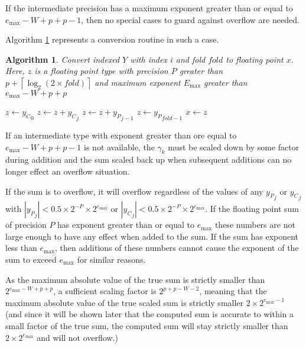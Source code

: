 \documentclass[12pt]{article}
\providecommand{\ceil}[1]{\left \lceil #1 \right \rceil }
\providecommand{\max}{\ensuremath{\text{max}}}
\theoremstyle{plain}
\newtheorem{alg}{Algorithm}[section]
\begin{document}
    If the intermediate precision has a maximum exponent greater than or equal to $e_{\max} - W + p + p - 1$, then no special cases to guard against overflow are needed.

    Algorithm \ref{alg:conv2float} represents a conversion routine in such a case.

    \begin{alg}
      Convert indexed $Y$ with index $i$ and fold $fold$ to floating point $x$. Here, $z$ is a floating point type with precision $P$ greater than $p + \ceil{\log_2(2 \times fold)}$ and maximum exponent $E_{\max}$ greater than $e_{\max} - W + p + p$
      \begin{algorithmic}
          \State $z \gets {y_C}_0$
            \State $z \gets z + {y_C}_j$
            \State $z \gets z + {y_P}_{j - 1}$
          \EndFor
          \State $z \gets {y_P}_{fold - 1}$
          \State $x \gets z$
        \EndFunction
      \end{algorithmic}
      \label{alg:conv2float}
    \end{alg}

    If an intermediate type with exponent greater than ore equal to $e_{\max} - W + p + p - 1$ is not available, the $\gamma_k$ must be scaled down by some factor during addition and the sum scaled back up when subsequent additions can no longer effect an overflow situation.

    If the sum is to overflow, it will overflow regardless of the values of any ${y_P}_j$ or ${y_C}_j$ with $|{y_P}_j| < 0.5 \times 2^{-P} \times 2^{e_{\max}}$ or $|{y_C}_j| < 0.5 \times 2^{-P} \times 2^{e_{\max}}$. If the floating point sum of precision $P$ has exponent greater than or equal to $e_{\max}$ these numbers are not large enough to have any effect when added to the sum. If the sum has exponent less than $e_{\max}$, then additions of these numbers cannot cause the exponent of the sum to exceed $e_{\max}$ for similar reasons.

    As the maximum absolute value of the true sum is strictly smaller than $2^{e_{\max} - W + p + p}$, a sufficient scaling factor is $2^{p + p - W - 2}$, meaning that the maximum absolute value of the true scaled sum is strictly smaller $2 \times 2^{e_{\max} - 1}$ (and since it will be shown later that the computed sum is accurate to within a small factor of the true sum, the computed sum will stay strictly smaller than $2 \times 2^{e_{\max}}$ and will not overflow.)
\end{document}
